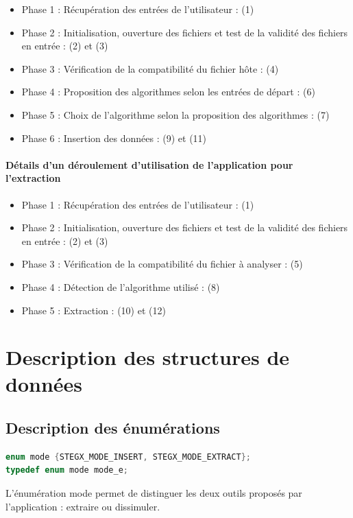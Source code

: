 \documentclass[11pt]{article}
\begin{document}
\begin{itemize}
\item Phase 1 : Récupération des entrées de l'utilisateur : (1)
\item Phase 2 : Initialisation, ouverture des fichiers et test de la 
validité des fichiers en entrée : (2) et (3)
\item Phase 3 : Vérification de la compatibilité du fichier hôte : (4)
\item Phase 4 : Proposition des algorithmes selon les entrées de départ : 
(6)
\item Phase 5 : Choix de l'algorithme selon la proposition des algorithmes : 
(7)
\item Phase 6 : Insertion des données : (9) et (11)
\end{itemize}

\paragraph{Détails d'un déroulement d'utilisation de l'application pour 
l'extraction}

\begin{itemize}
\item Phase 1 : Récupération des entrées de l'utilisateur : (1)
\item Phase 2 : Initialisation, ouverture des fichiers et test de la 
validité des fichiers en entrée : (2) et (3)
\item Phase 3 : Vérification de la compatibilité du fichier à analyser : 
(5)
\item Phase 4 : Détection de l'algorithme utilisé : (8)
\item Phase 5 : Extraction : (10) et (12)
\end{itemize}
\newpage

\section{Description des structures de données}

\subsection{Description des énumérations}

\begin{lstlisting}[language=c]
enum mode {STEGX_MODE_INSERT, STEGX_MODE_EXTRACT};
typedef enum mode mode_e;
\end{lstlisting}

L'énumération mode permet de distinguer les deux outils proposés par 
l'application : extraire ou dissimuler. 
\newline
\end{document}
